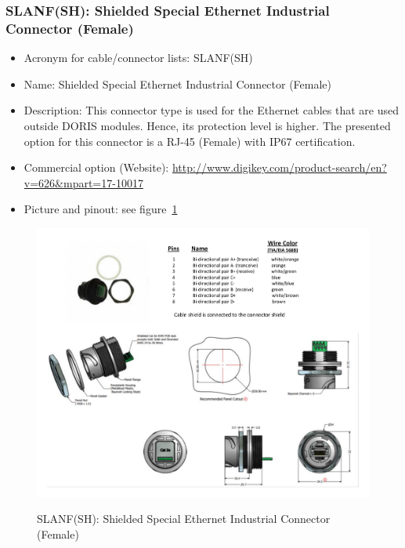 \subsubsection{SLANF(SH): Shielded Special Ethernet Industrial Connector (Female)} \label{DEVICE:SLANF(SH)}
\begin{itemize}
  \item Acronym for cable/connector lists: SLANF(SH)
  \item Name: Shielded Special Ethernet Industrial Connector (Female)
  \item Description: This connector type is used for the Ethernet cables that are used outside DORIS modules. Hence, its protection level is higher. The presented option for this connector is a RJ-45 (Female) with IP67 certification.
  \item Commercial option (Website): \href{http://www.digikey.com/product-search/en?v=626\&mpart=17-10017}{http://www.digikey.com/product-search/en?v=626\&mpart=17-10017}
  \item Picture and pinout: see figure~\ref{FIG:DEVICESLANF(SH)}
\end{itemize}
\begin{figure}
  \centering
  \includegraphics[angle=90,width=1\columnwidth]{figs/body02/FIGDEVICESLANF(SH).pdf}\\
  \caption[SLANF(SH): Shielded Special Ethernet Industrial Connector (Female)]{SLANF(SH): Shielded Special Ethernet Industrial Connector (Female)}
  \label{FIG:DEVICESLANF(SH)}
\end{figure}
